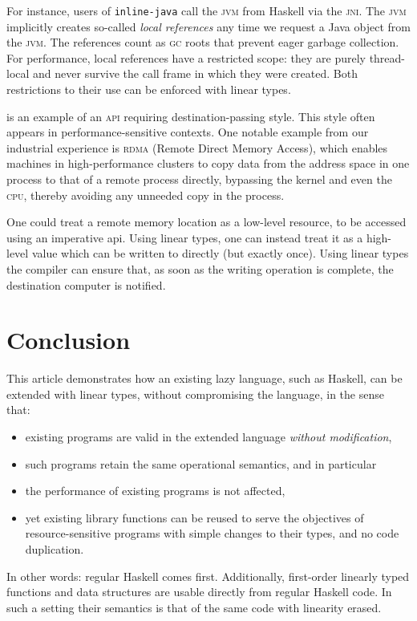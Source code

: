 \documentclass[acmsmall,screen]{acmart}\settopmatter{}
\begin{document}
\begin{description}
  For instance, users of \texttt{inline-java} call the \textsc{jvm}
  from Haskell via the \textsc{jni}. The \textsc{jvm} implicitly
  creates so-called \emph{local references} any time we request a Java
  object from the \textsc{jvm}. The references count as \textsc{gc}
  roots that prevent eager garbage collection. For performance, local
  references have a restricted scope: they are purely thread-local and
  never survive the call frame in which they were created. Both
  restrictions to their use can be enforced with linear types.

\item[Remote direct memory access]
   is an example of an \textsc{api} requiring
  destination-passing style. This style often appears
  in performance-sensitive contexts. One notable example from our
  industrial experience is \textsc{rdma} (Remote Direct Memory Access),
  which enables machines in high-performance clusters to copy data
  from the address space in one process to that of a remote process
  directly, bypassing the kernel and even the
  \textsc{cpu}, thereby avoiding any unneeded copy in the process.

  One could treat a remote memory location as a low-level resource, to
  be accessed using an imperative {\sc api}. Using linear types, one
  can instead treat it as a high-level value which can be written to
  directly (but exactly once). Using linear types the compiler can
  ensure that, as soon as the writing operation is complete, the
  destination computer is notified.
\end{description}



\section{Conclusion}

This article demonstrates how an existing lazy language, such
as Haskell, can be extended with linear types, without compromising
the language, in the sense that:
\begin{itemize}
\item existing programs are valid in the extended language
  \emph{without modification},
\item such programs retain the same operational semantics, and in particular
\item the performance of existing programs is not affected,
\item yet existing library functions can be reused to serve the
  objectives of resource-sensitive programs with simple changes to
  their types, and no code duplication.
\end{itemize}
In other words: regular Haskell comes first. Additionally, first-order
linearly typed functions and data structures are usable directly from
regular Haskell code. In such a setting their semantics is that of
the same code with linearity erased.
\end{document}
